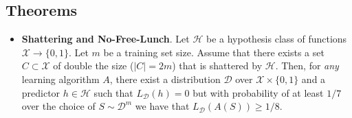 \documentclass[../template.tex]{subfiles}
\begin{document}
\subsection{Theorems}
\begin{itemize}
    \item \textbf{Shattering and No-Free-Lunch}. Let $\mathcal{H}$ be a hypothesis class of functions $\mathcal{X} \to\{0,1\}$. Let $m$ be a training set size. Assume that there exists a set $C \subset \mathcal{X}$ of double the size ($|C| = 2m$) that is shattered by $\mathcal{H}$. Then, for \textit{any} learning algorithm $A$, there exist a distribution $\mathcal{D}$ over $\mathcal{X}\times \{0,1\}$ and a predictor $h \in \mathcal{H}$ such that $L_{\mathcal{D}}(h) = 0$ but with probability of at least $1/7$ over the choice of $S \sim \mathcal{D}^m$ we have that $L_{\mathcal{D}}(A(S)) \geq 1/8$.   
\end{itemize}
\end{document}
